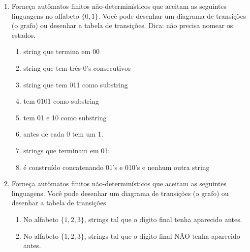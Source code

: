 \documentclass[12pt]{article}
\begin{document}
\begin{enumerate}

\item Forneça autômatos finitos não-determinísticos que aceitam as seguintes linguagens no alfabeto $\{0,1\}$. Você pode desenhar um diagrama de transições (o grafo) ou desenhar a tabela de transições. Dica: não precisa nomear os estados.

\begin{enumerate}

\item string que termina em 00

\item string que tem três 0's consecutivos

\item string que tem 011 como substring

\item tem 0101 como substring

\item tem 01 e 10 como substring

\item antes de cada 0 tem um 1.

\item strings que terminam em 01:



\item é construído concatenando 01's e 010's e nenhum outra string

\end{enumerate}

\item Forneça autômatos finitos não-determinísticos que aceitam as seguintes linguagens. Você pode desenhar um diagrama de transições (o grafo) ou desenhar a tabela de transições.
\begin{enumerate}

\item No alfabeto $\{1,2,3\}$, strings tal que o dígito final tenha aparecido antes.

\item No alfabeto $\{1,2,3\}$, strings tal que o dígito final NÃO tenha aparecido antes.

\end{enumerate}






\end{enumerate}
\end{document}
